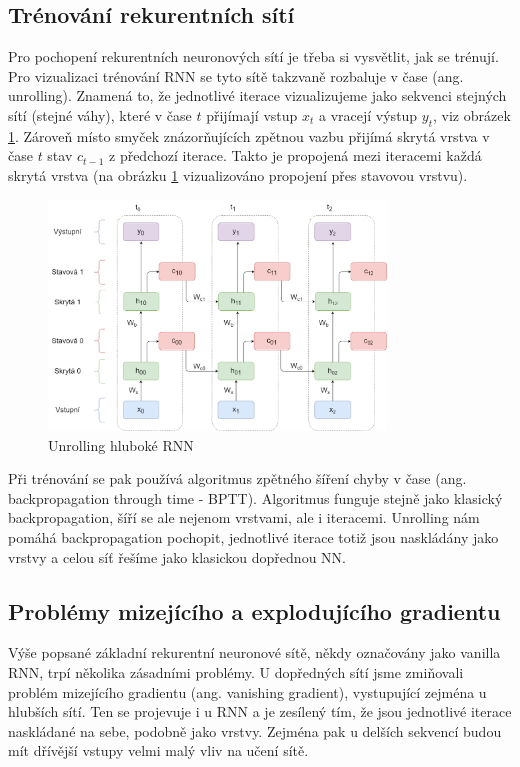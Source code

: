 \subsection{Trénování rekurentních sítí}

Pro pochopení rekurentních neuronových sítí je třeba si vysvětlit, jak se
trénují. Pro vizualizaci trénování RNN se tyto sítě takzvaně rozbaluje v čase
(ang. unrolling). Znamená to, že jednotlivé iterace vizualizujeme jako sekvenci
stejných sítí (stejné váhy), které v čase $t$ přijímají vstup $x_t$ a vracejí
výstup $y_t$, viz obrázek \ref{fig:bptt}. Zároveň místo smyček znázorňujících
zpětnou vazbu přijímá skrytá vrstva v čase $t$ stav $c_{t-1}$ z předchozí
iterace. Takto je propojená mezi iteracemi každá skrytá vrstva (na obrázku
\ref{fig:bptt} vizualizováno propojení přes stavovou vrstvu).

\begin{figure}[]
    \centering
    \includegraphics[width=0.8\textwidth]{Figures/BPTT_weight.png}
    \caption{Unrolling hluboké RNN}
    \label{fig:bptt}
\end{figure}

Při trénování se pak používá algoritmus zpětného šíření chyby v čase (ang.
backpropagation through time - BPTT). Algoritmus funguje stejně jako klasický
backpropagation, šíří se ale nejenom vrstvami, ale i iteracemi. Unrolling nám
pomáhá backpropagation pochopit, jednotlivé iterace totiž jsou naskládány jako
vrstvy a celou síť řešíme jako klasickou dopřednou NN.

\subsection{Problémy mizejícího a explodujícího gradientu}

Výše popsané základní rekurentní neuronové sítě, někdy označovány jako vanilla
RNN, trpí několika zásadními problémy. U dopředných sítí jsme zmiňovali problém
mizejícího gradientu (ang. vanishing gradient), vystupující zejména u hlubších
sítí. Ten se projevuje i u RNN a je zesílený tím, že jsou jednotlivé iterace
naskládané na sebe, podobně jako vrstvy. Zejména pak u delších sekvencí budou
mít dřívější vstupy velmi malý vliv na učení sítě.

